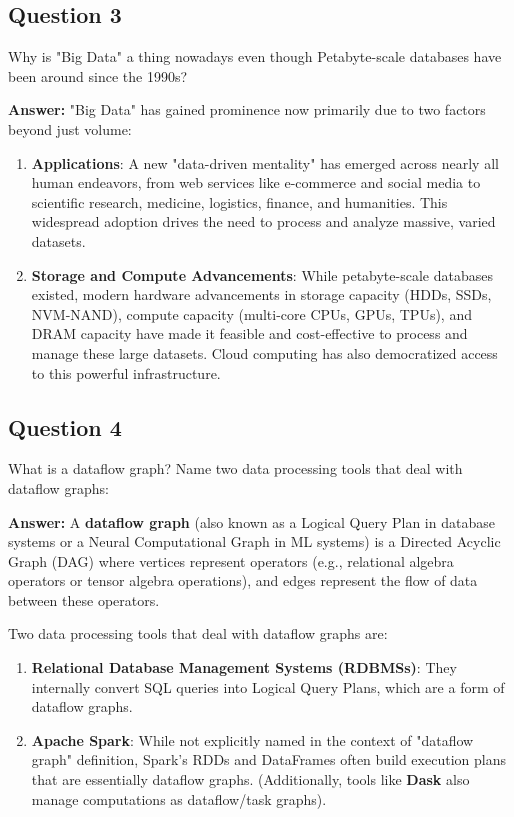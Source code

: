 \documentclass{article}
\begin{document}
\subsection*{Question 3}
Why is "Big Data" a thing nowadays even though Petabyte-scale databases have been around since the 1990s? 

\textbf{Answer:}
"Big Data" has gained prominence now primarily due to two factors beyond just volume:
\begin{enumerate}
    \item \textbf{Applications}: A new "data-driven mentality" has emerged across nearly all human endeavors, from web services like e-commerce and social media to scientific research, medicine, logistics, finance, and humanities. This widespread adoption drives the need to process and analyze massive, varied datasets.
    \item \textbf{Storage and Compute Advancements}: While petabyte-scale databases existed, modern hardware advancements in storage capacity (HDDs, SSDs, NVM-NAND), compute capacity (multi-core CPUs, GPUs, TPUs), and DRAM capacity have made it feasible and cost-effective to process and manage these large datasets. Cloud computing has also democratized access to this powerful infrastructure.
\end{enumerate}

\subsection*{Question 4}
What is a dataflow graph? Name two data processing tools that deal with dataflow graphs: 

\textbf{Answer:}
A \textbf{dataflow graph} (also known as a Logical Query Plan in database systems or a Neural Computational Graph in ML systems) is a Directed Acyclic Graph (DAG) where vertices represent operators (e.g., relational algebra operators or tensor algebra operations), and edges represent the flow of data between these operators.

Two data processing tools that deal with dataflow graphs are:
\begin{enumerate}
    \item \textbf{Relational Database Management Systems (RDBMSs)}: They internally convert SQL queries into Logical Query Plans, which are a form of dataflow graphs.
    \item \textbf{Apache Spark}: While not explicitly named in the context of "dataflow graph" definition, Spark's RDDs and DataFrames often build execution plans that are essentially dataflow graphs. (Additionally, tools like \textbf{Dask} also manage computations as dataflow/task graphs).
\end{enumerate}
\end{document}
